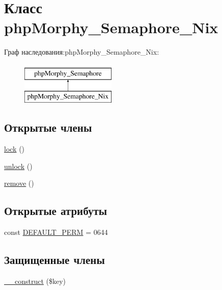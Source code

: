 \hypertarget{classphpMorphy__Semaphore__Nix}{
\section{Класс phpMorphy\_\-Semaphore\_\-Nix}
\label{classphpMorphy__Semaphore__Nix}
}
Граф наследования:phpMorphy\_\-Semaphore\_\-Nix:\begin{figure}[H]
\begin{center}
\leavevmode
\includegraphics[height=2.000000cm]{classphpMorphy__Semaphore__Nix}
\end{center}
\end{figure}
\subsection*{Открытые члены}
\begin{DoxyCompactItemize}
\item 
\hyperlink{classphpMorphy__Semaphore__Nix_ab8d4737585197d3d4bcdc19a6e25e251}{lock} ()
\item 
\hyperlink{classphpMorphy__Semaphore__Nix_a23a8bc6e01b42892d6127a1daa052dd6}{unlock} ()
\item 
\hyperlink{classphpMorphy__Semaphore__Nix_a784a1a255aaabf8a326492a4b34fdd35}{remove} ()
\end{DoxyCompactItemize}
\subsection*{Открытые атрибуты}
\begin{DoxyCompactItemize}
\item 
const \hyperlink{classphpMorphy__Semaphore__Nix_aa3c36d0322e0cb707b37f54056c2c8d7}{DEFAULT\_\-PERM} = 0644
\end{DoxyCompactItemize}
\subsection*{Защищенные члены}
\begin{DoxyCompactItemize}
\item 
\hyperlink{classphpMorphy__Semaphore__Nix_aa49f56f0267896eae664615f9b8b7b8b}{\_\-\_\-construct} (\$key)
\end{DoxyCompactItemize}

